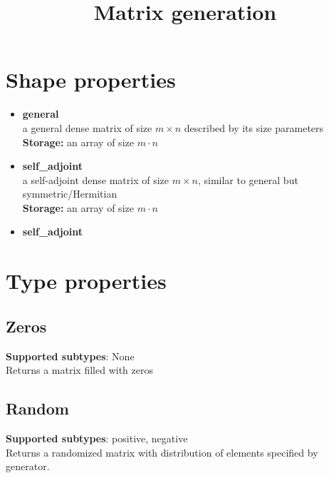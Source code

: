 \documentclass{article}
\title{Matrix generation}
\begin{document}
\section{Shape properties}

\begin{itemize}
\item \textbf{general} \\
a general dense matrix of size $m \times n$ described by its size parameters \\
\textbf{Storage:} an array of size $m \cdot n$
\item \textbf{self\_adjoint} \\
a self-adjoint dense matrix of size $m \times n$, similar to general but symmetric/Hermitian \\
\textbf{Storage:} an array of size $m \cdot n$
\item \textbf{self\_adjoint} \\
\end{itemize}

\section{Type properties}

\subsection{Zeros}
\textbf{Supported subtypes}: None \\
Returns a matrix filled with zeros

\subsection{Random}
\textbf{Supported subtypes}: positive, negative \\
Returns a randomized matrix with distribution of elements specified by generator.
\end{document}
